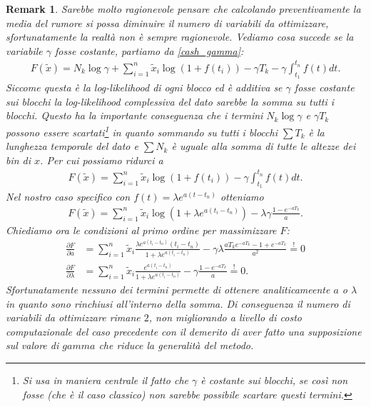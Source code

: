 \documentclass[10pt,a4paper]{report}
\newtheorem{remark}{Remark}
\begin{document}
\begin{remark}
Sarebbe molto ragionevole pensare che calcolando preventivamente la media del rumore si possa diminuire il numero di variabili da ottimizzare, sfortunatamente la realtà non è sempre ragionevole. Vediamo cosa succede se la variabile $\gamma$ fosse costante, partiamo da \eqref{cash_gamma}:
\begin{align*}
F(\tilde{x}) = N_k\log\gamma + \sum_{i=1}^n\tilde{x}_i\log(1+f(t_i)) -\gamma T_k -\gamma\int_{t_1}^{t_n}f(t) dt.
\end{align*}
Siccome questa è la log-likelihood di ogni blocco ed è additiva se $\gamma$ fosse costante sui blocchi la log-likelihood complessiva del dato sarebbe la somma su tutti i blocchi. Questo ha la importante conseguenza che i termini $N_k\log\gamma$ e $\gamma T_k$ possono essere scartati\footnote{Si usa in maniera centrale il fatto che $\gamma$ è costante sui blocchi, se così non fosse (che è il caso classico) non sarebbe possibile scartare questi termini.} in quanto sommando su tutti i blocchi $\sum T_k$ è la lunghezza temporale del dato e $\sum N_k$ è uguale alla somma di tutte le altezze dei bin di $x$. Per cui possiamo ridurci a
\begin{align*}
F(\tilde{x}) = \sum_{i=1}^n\tilde{x}_i\log(1+f(t_i)) -\gamma\int_{t_1}^{t_n}f(t) dt.
\end{align*}
Nel nostro caso specifico con $f(t)=\lambda e^{a(t-t_n)}$ otteniamo
\begin{align*}
F(\tilde{x}) = \sum_{i=1}^n\tilde{x}_i\log(1+\lambda e^{a(t_i-t_n)}) -\lambda\gamma\frac{1-e^{-aT_k}}{a}.
\end{align*}
Chiediamo ora le condizioni al primo ordine per massimizzare $F$:
\begin{align*}
\frac{\partial F}{\partial a} &= \sum_{i=1}^n\tilde{x}_i\frac{\lambda e^{a(t_i-t_n)}(t_i-t_n)}{1+\lambda e^{a(t_i-t_n)}}-\gamma\lambda\frac{aT_ke^{-aT_k}-1+e^{-aT_k}}{a^2}\stackrel{!}{=}0\\
\frac{\partial F}{\partial \lambda} &= \sum_{i=1}^n\tilde{x}_i\frac{e^{a(t_i-t_n)}}{1+\lambda e^{a(t_i-t_n)}}-\gamma\frac{1-e^{-aT_k}}{a}\stackrel{!}{=}0.
\end{align*}
Sfortunatamente nessuno dei termini permette di ottenere analiticameente $a$ o $\lambda$ in quanto sono rinchiusi all'interno della somma. Di conseguenza il numero di variabili da ottimizzare rimane $2$, non migliorando a livello di costo computazionale del caso precedente con il demerito di aver fatto una supposizione sul valore di $gamma$ che riduce la generalità del metodo.
\end{remark}
\end{document}

